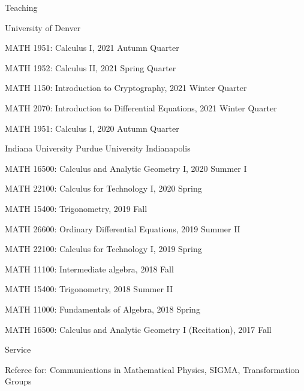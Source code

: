 \documentclass{resume} %
\begin{document}
\begin{rSection}{Teaching}
\begin{rSubsection}{University of Denver}{}
{}{}
  \item {MATH 1951: Calculus I, 2021 Autumn Quarter}\\
  \item {MATH 1952: Calculus II, 2021 Spring Quarter}\\
  \item {MATH 1150: Introduction to Cryptography, 2021 Winter Quarter}\\
  \item {MATH 2070: Introduction to Differential Equations, 2021 Winter Quarter}\\
  \item {MATH 1951: Calculus I, 2020 Autumn Quarter}\\
\end{rSubsection}

\begin{rSubsection}{Indiana University Purdue University Indianapolis}{}
{}{}
  \item {MATH 16500: Calculus and Analytic Geometry I, 2020 Summer I}\\
  \item {MATH 22100: Calculus for Technology I, 2020 Spring}\\
  \item {MATH 15400: Trigonometry, 2019 Fall}\\
  \item {MATH 26600: Ordinary Differential Equations, 2019 Summer II}\\
  \item {MATH 22100: Calculus for Technology I, 2019 Spring}\\
  \item {MATH 11100: Intermediate algebra, 2018 Fall}\\
  \item {MATH 15400: Trigonometry, 2018 Summer II}\\
  \item {MATH 11000: Fundamentals of Algebra, 2018 Spring}\\
  \item {MATH 16500: Calculus and Analytic Geometry I (Recitation), 2017 Fall}\\
\end{rSubsection}
\end{rSection}

\begin{rSection}{Service}
\begin{rSubsection}{}{}
{}{}
\item Referee for: Communications in Mathematical Physics, SIGMA, Transformation Groups \\ 	
\end{rSubsection}
\end{rSection}
\end{document}
